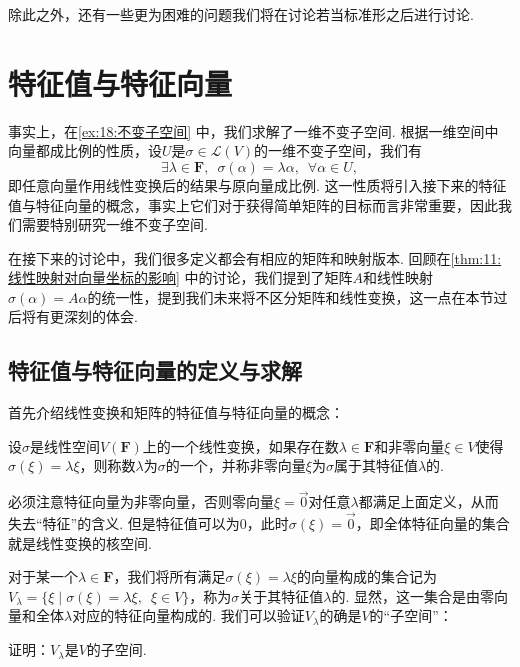 除此之外，还有一些更为困难的问题我们将在讨论若当标准形之后进行讨论.

\section{特征值与特征向量}

事实上，在\autoref{ex:18:不变子空间} 中，我们求解了一维不变子空间. 根据一维空间中向量都成比例的性质，设$U$是$\sigma\in\mathcal{L}(V)$的一维不变子空间，我们有
\[\exists\lambda\in\mathbf{F},\enspace\sigma(\alpha)=\lambda\alpha,\enspace\forall \alpha\in U,\]
即任意向量作用线性变换后的结果与原向量成比例. 这一性质将引入接下来的特征值与特征向量的概念，事实上它们对于获得简单矩阵的目标而言非常重要，因此我们需要特别研究一维不变子空间.

在接下来的讨论中，我们很多定义都会有相应的矩阵和映射版本. 回顾在\autoref{thm:11:线性映射对向量坐标的影响} 中的讨论，我们提到了矩阵$A$和线性映射$\sigma(\alpha)=A\alpha$的统一性，提到我们未来将不区分矩阵和线性变换，这一点在本节过后将有更深刻的体会.

\subsection{特征值与特征向量的定义与求解}

首先介绍线性变换和矩阵的特征值与特征向量的概念：
\begin{definition}
    设$\sigma$是线性空间$V(\mathbf{F})$上的一个线性变换，如果存在数$\lambda\in\mathbf{F}$和非零向量$\xi\in V$使得$\sigma(\xi)=\lambda\xi$，则称数$\lambda$为$\sigma$的一个，并称非零向量$\xi$为$\sigma$属于其特征值$\lambda$的.
\end{definition}
必须注意特征向量为非零向量，否则零向量$\xi=\vec{0}$对任意$\lambda$都满足上面定义，从而失去``特征''的含义. 但是特征值可以为0，此时$\sigma(\xi)=\vec{0}$，即全体特征向量的集合就是线性变换的核空间.

对于某一个$\lambda\in\mathbf{F}$，我们将所有满足$\sigma(\xi)=\lambda\xi$的向量构成的集合记为$V_\lambda=\{\xi \mid \sigma(\xi)=\lambda\xi,\enspace\xi\in V\}$，称为$\sigma$关于其特征值$\lambda$的. 显然，这一集合是由零向量和全体$\lambda$对应的特征向量构成的. 我们可以验证$V_\lambda$的确是$V$的``子空间''：
\begin{example}
    证明：$V_\lambda$是$V$的子空间.
\end{example}

